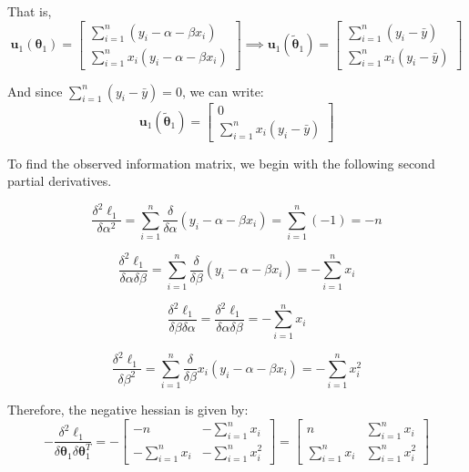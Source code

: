 \documentclass{article}
\newcommand{\thetaOne}{\boldsymbol{\theta}_1}
\newcommand{\thetaOneTilde}{\tilde{\boldsymbol{\theta}}_1}
\newcommand{\sumN}{\sum_{i=1}^n}
\newcommand{\ellOne}{\ell_1}
\newcommand{\betaZero}{\alpha} %
\newcommand{\betaOne}{\beta} %
\newcommand{\yBar}{\bar{y}}
\newcommand{\deltaBetaZero}{\frac{\delta}{\delta \alpha}}
\newcommand{\deltaBetaOne}{\frac{\delta}{\delta \beta}}
\begin{document}
That is,
\begin{equation*}
  \boldsymbol{u}_1 (\thetaOne) =
  \begin{bmatrix}
    \sumN(y_i - \betaZero - \betaOne x_i) \\
    \sumN x_i (y_i - \betaZero - \betaOne x_i)
  \end{bmatrix}
  \implies
  \boldsymbol{u}_1 (\thetaOneTilde) =
  \begin{bmatrix}
    \sumN(y_i - \yBar) \\
    \sumN x_i (y_i - \yBar)
  \end{bmatrix}
\end{equation*}

And since $\sumN (y_i - \yBar) = 0$, we can write:
\begin{equation*}
  \boldsymbol{u}_1 (\thetaOneTilde) =
  \begin{bmatrix}
    0 \\
    \sumN x_i (y_i - \yBar)
  \end{bmatrix}
\end{equation*}

To find the observed information matrix, we begin with the following
second partial derivatives.

\begin{equation*}
  \frac{\delta^2 \ellOne}{\delta \betaZero^2} = \sumN \deltaBetaZero (y_i -
  \betaZero - \betaOne x_i) = \sumN (-1) = -n
\end{equation*}

\begin{equation*}
  \frac{\delta^2 \ellOne}{\delta \betaZero \delta \betaOne} =
  \sumN
  \deltaBetaOne (y_i - \betaZero - \betaOne x_i) = - \sumN x_i
\end{equation*}

\begin{equation*}
  \frac{\delta^2 \ellOne}{\delta \betaOne \delta \betaZero} =
  \frac{\delta^2 \ellOne}{\delta \betaZero \delta \betaOne} = - \sumN x_i
\end{equation*}

\begin{equation*}
  \frac{\delta^2 \ellOne}{\delta \betaOne^2} = \sumN \deltaBetaOne x_i (y_i -
  \betaZero - \betaOne x_i) = - \sumN x_i^2
\end{equation*}

Therefore, the negative hessian is given by:
\begin{equation*}
  - \frac{\delta^2 \ellOne}{\delta \thetaOne \delta \thetaOne^T} = -
  \begin{bmatrix}
    -n & - \sumN x_i \\
    - \sumN x_i & - \sumN x_i^2
  \end{bmatrix} =
  \begin{bmatrix}
    n & \sumN x_i \\
    \sumN x_i & \sumN x_i^2
  \end{bmatrix}
\end{equation*}
\end{document}
